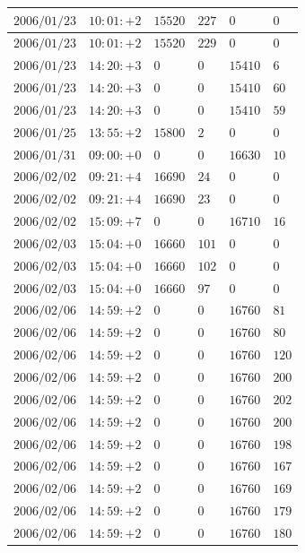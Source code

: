 \documentclass[a4j,papersize,disablejfam,slide,14pt]{jsarticle}
\begin{document}
\begin{description}
\begin{center}
\begin{longtable}{|l|l|l|l|l|l|}
					$2006/01/23$ & $10:01:+2$  & $15520$ & $227$ & $0$ & $0$ \\ \hline
					$2006/01/23$ & $10:01:+2$  & $15520$ & $229$ & $0$ & $0$ \\ \hline
					$2006/01/23$ & $14:20:+3$  & $0$ & $0$ & $15410$ & $6$ \\ \hline
					$2006/01/23$ & $14:20:+3$  & $0$ & $0$ & $15410$ & $60$ \\ \hline
					$2006/01/23$ & $14:20:+3$  & $0$ & $0$ & $15410$ & $59$ \\ \hline
					$2006/01/25$ & $13:55:+2$  & $15800$ & $2$ & $0$ & $0$ \\ \hline
					$2006/01/31$ & $09:00:+0$  & $0$ & $0$ & $16630$ & $10$ \\ \hline
					$2006/02/02$ & $09:21:+4$  & $16690$ & $24$ & $0$ & $0$ \\ \hline
					$2006/02/02$ & $09:21:+4$  & $16690$ & $23$ & $0$ & $0$ \\ \hline
					$2006/02/02$ & $15:09:+7$  & $0$ & $0$ & $16710$ & $16$ \\ \hline
					$2006/02/03$ & $15:04:+0$  & $16660$ & $101$ & $0$ & $0$ \\ \hline
					$2006/02/03$ & $15:04:+0$  & $16660$ & $102$ & $0$ & $0$ \\ \hline
					$2006/02/03$ & $15:04:+0$  & $16660$ & $97$ & $0$ & $0$ \\ \hline
					$2006/02/06$ & $14:59:+2$  & $0$ & $0$ & $16760$ & $81$ \\ \hline
					$2006/02/06$ & $14:59:+2$  & $0$ & $0$ & $16760$ & $80$ \\ \hline
					$2006/02/06$ & $14:59:+2$  & $0$ & $0$ & $16760$ & $120$ \\ \hline
					$2006/02/06$ & $14:59:+2$  & $0$ & $0$ & $16760$ & $200$ \\ \hline
					$2006/02/06$ & $14:59:+2$  & $0$ & $0$ & $16760$ & $202$ \\ \hline
					$2006/02/06$ & $14:59:+2$  & $0$ & $0$ & $16760$ & $200$ \\ \hline
					$2006/02/06$ & $14:59:+2$  & $0$ & $0$ & $16760$ & $198$ \\ \hline
					$2006/02/06$ & $14:59:+2$  & $0$ & $0$ & $16760$ & $167$ \\ \hline
					$2006/02/06$ & $14:59:+2$  & $0$ & $0$ & $16760$ & $169$ \\ \hline
					$2006/02/06$ & $14:59:+2$  & $0$ & $0$ & $16760$ & $179$ \\ \hline
					$2006/02/06$ & $14:59:+2$  & $0$ & $0$ & $16760$ & $180$ \\ \hline

\end{longtable}
\end{center}
\end{description}
\end{document}
